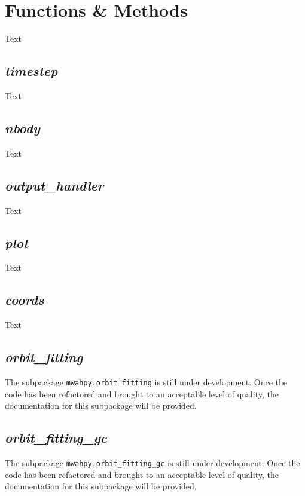 \documentclass{article}
\begin{document}
\section{Functions \& Methods}

Text

\subsection{\textit{timestep}} \label{sec:doc_timestep}

Text

\subsection{\textit{nbody}}

Text

\subsection{\textit{output\_handler}}

Text

\subsection{\textit{plot}}

Text

\subsection{\textit{coords}} \label{sec:doc_coords}

Text

\subsection{\textit{orbit\_fitting}}

The subpackage \verb!mwahpy.orbit_fitting! is still under development. Once the code has been refactored and brought to an acceptable level of quality, the documentation for this subpackage will be provided. 

\subsection{\textit{orbit\_fitting\_gc}}

The subpackage \verb!mwahpy.orbit_fitting_gc! is still under development. Once the code has been refactored and brought to an acceptable level of quality, the documentation for this subpackage will be provided.  
\end{document}
